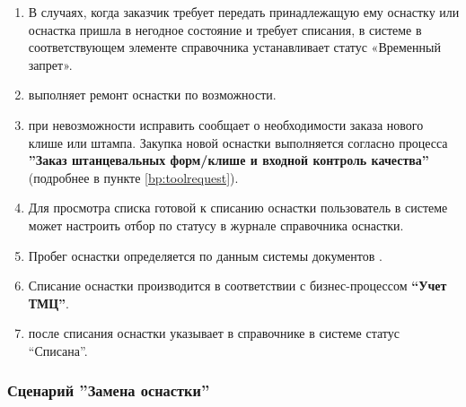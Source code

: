 \begin{enumerate}
\item	В случаях, когда заказчик требует передать принадлежащую ему оснастку или оснастка пришла в негодное состояние и требует списания, \tehnolog в системе \gofro в соответствующем элементе справочника  устанавливает статус «Временный запрет».
\item \operator выполняет ремонт оснастки по возможности.
\item \operator при невозможности исправить  сообщает \tehnolog о необходимости заказа
нового клише или штампа. Закупка новой оснастки выполняется согласно процесса \textbf{''Заказ штанцевальных форм/клише и входной контроль качества''} (подробнее в пункте \ref{bp:toolrequest}).
\item	Для просмотра списка готовой к списанию оснастки пользователь в системе \gofro может настроить отбор по статусу в журнале справочника оснастки.
\item Пробег оснастки определяется по данным системы \gofro документов .
\item	Списание оснастки производится в соответствии с бизнес-процессом \textbf{“Учет ТМЦ”}.
\item	\tehnolog после списания оснастки  указывает в справочнике  в системе \gofro статус “Списана”.

\end{enumerate}


\subsubsection{Сценарий ''Замена оснастки''}
\label{bp:tool_3}

